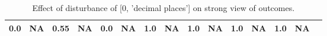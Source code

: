 \begin{table}
\begin{tabular}{l|cc|cc|cc|cc|cc|cc|cc}
\cellcolor{Bittersweet}0.0&\cellcolor{Bittersweet}NA&\cellcolor{Bittersweet}0.55&\cellcolor{Bittersweet}NA&\cellcolor{Bittersweet}0.0&\cellcolor{Bittersweet}NA&\cellcolor{Bittersweet}1.0&\cellcolor{Bittersweet}NA&\cellcolor{Bittersweet}1.0&\cellcolor{Bittersweet}NA&\cellcolor{Bittersweet}1.0&\cellcolor{Bittersweet}NA&\cellcolor{Bittersweet}1.0&\cellcolor{Bittersweet}NA\\\bottomrule\end{tabular}\caption{Effect of disturbance of [0, 'decimal places'] on strong view of outcomes.}\end{table}